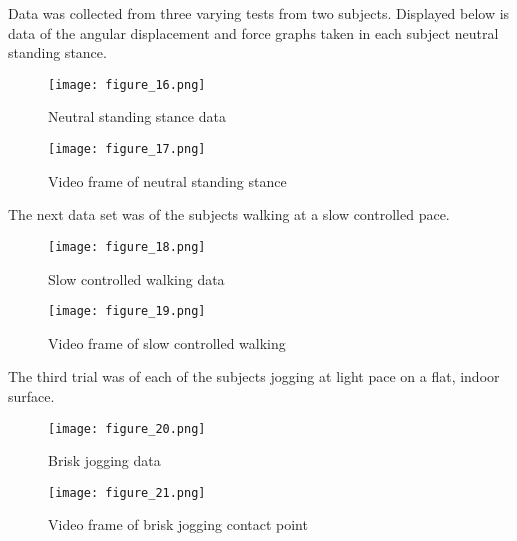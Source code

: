 Data was collected from three varying tests from two subjects.
Displayed below is data of the angular displacement and force graphs taken in each subject neutral standing stance.\par
\begin{figure}
  \centering
  \texttt{[image: figure\_16.png]}
  \caption[Neutral stance data]{Neutral standing stance data}
  \label{fig:x neutral data}
\end{figure}
\begin{figure}
  \centering
  \texttt{[image: figure\_17.png]}
  \caption[Neutral stance frame]{Video frame of neutral standing stance}
  \label{fig:x neutral frame}
\end{figure}
The next data set was of the subjects walking at a slow controlled pace.\par
\begin{figure}
  \centering
  \texttt{[image: figure\_18.png]}
  \caption[Slow walking data]{Slow controlled walking data}
  \label{fig:x slow data}
\end{figure}
\begin{figure}
  \centering
  \texttt{[image: figure\_19.png]}
  \caption[Slow walking frame]{Video frame of slow controlled walking}
  \label{fig:x slow frame}
\end{figure}
The third trial was of each of the subjects jogging at light pace on a flat, indoor surface.\par
\begin{figure}
  \centering
  \texttt{[image: figure\_20.png]}
  \caption[Brisk jogging data]{Brisk jogging data}
  \label{fig:x brisk data}
\end{figure}
\begin{figure}
  \centering
  \texttt{[image: figure\_21.png]}
  \caption[Brisk jogging frame]{Video frame of brisk jogging contact point}
  \label{fig:x brisk frame}
\end{figure}
